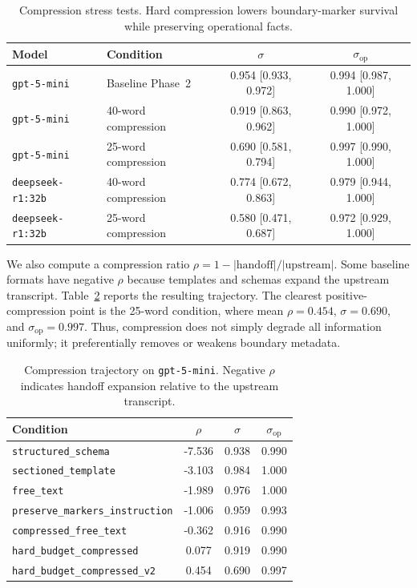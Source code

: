\begin{table}[t]
\centering
\caption{Compression stress tests. Hard compression lowers boundary-marker survival while preserving operational facts.}
\label{tab:compression_stress}
\small
\begin{tabular}{@{}llcc@{}}
\toprule
\textbf{Model} & \textbf{Condition} & \boldmath$\sigma$ & \boldmath$\sigma_{\mathrm{op}}$ \\
\midrule
\texttt{gpt-5-mini} & Baseline Phase~2 & 0.954 [0.933, 0.972] & 0.994 [0.987, 1.000] \\
\texttt{gpt-5-mini} & 40-word compression & 0.919 [0.863, 0.962] & 0.990 [0.972, 1.000] \\
\texttt{gpt-5-mini} & 25-word compression & 0.690 [0.581, 0.794] & 0.997 [0.990, 1.000] \\
\midrule
\texttt{deepseek-r1:32b} & 40-word compression & 0.774 [0.672, 0.863] & 0.979 [0.944, 1.000] \\
\texttt{deepseek-r1:32b} & 25-word compression & 0.580 [0.471, 0.687] & 0.972 [0.929, 1.000] \\
\bottomrule
\end{tabular}
\end{table}

We also compute a compression ratio $\rho = 1 - |\mathrm{handoff}|/|\mathrm{upstream}|$. Some baseline formats have negative $\rho$ because templates and schemas expand the upstream transcript. Table~\ref{tab:sigma_rho_compact} reports the resulting trajectory. The clearest positive-compression point is the 25-word condition, where mean $\rho=0.454$, $\sigma=0.690$, and $\sigma_{\mathrm{op}}=0.997$. Thus, compression does not simply degrade all information uniformly; it preferentially removes or weakens boundary metadata.

\begin{table}[t]
\centering
\caption{Compression trajectory on \texttt{gpt-5-mini}. Negative $\rho$ indicates handoff expansion relative to the upstream transcript.}
\label{tab:sigma_rho_compact}
\small
\begin{tabular}{@{}lccc@{}}
\toprule
\textbf{Condition} & \boldmath$\rho$ & \boldmath$\sigma$ & \boldmath$\sigma_{\mathrm{op}}$ \\
\midrule
\texttt{structured\_schema}             & -7.536 & 0.938 & 0.990 \\
\texttt{sectioned\_template}            & -3.103 & 0.984 & 1.000 \\
\texttt{free\_text}                     & -1.989 & 0.976 & 1.000 \\
\texttt{preserve\_markers\_instruction} & -1.006 & 0.959 & 0.993 \\
\texttt{compressed\_free\_text}         & -0.362 & 0.916 & 0.990 \\
\texttt{hard\_budget\_compressed}       &  0.077 & 0.919 & 0.990 \\
\texttt{hard\_budget\_compressed\_v2}   &  0.454 & 0.690 & 0.997 \\
\bottomrule
\end{tabular}
\end{table}

